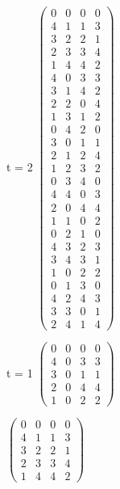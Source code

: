 \documentclass{article}
\begin{document}
t = 2
$\begin{pmatrix}
0&0&0&0\\
4&1&1&3\\
3&2&2&1\\
2&3&3&4\\
1&4&4&2\\
4&0&3&3\\
3&1&4&2\\
2&2&0&4\\
1&3&1&2\\
0&4&2&0\\
3&0&1&1\\
2&1&2&4\\
1&2&3&2\\
0&3&4&0\\
4&4&0&3\\
2&0&4&4\\
1&1&0&2\\
0&2&1&0\\
4&3&2&3\\
3&4&3&1\\
1&0&2&2\\
0&1&3&0\\
4&2&4&3\\
3&3&0&1\\
2&4&1&4
\end{pmatrix}$




t = 1
$\begin{pmatrix}
0&0&0&0\\
4&0&3&3\\
3&0&1&1\\
2&0&4&4\\
1&0&2&2
\end{pmatrix}$

$\begin{pmatrix}
0&0&0&0\\
4&1&1&3\\
3&2&2&1\\
2&3&3&4\\
1&4&4&2
\end{pmatrix}$

  
\end{document}
